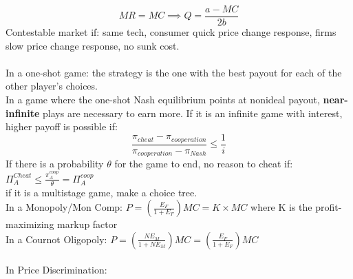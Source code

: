 \documentclass[nobib,fleqn,8pt]{article}
\begin{document}
\begin{equation*}
    MR = MC \implies Q = \frac{a-MC}{2b}
\end{equation*}
Contestable market if: same tech, consumer quick price change response, firms slow price change response, no sunk cost.\\~\\
In a one-shot game: the strategy is the one with the best payout for each of the other player's choices.\\
In a game where the one-shot Nash equilibrium points at nonideal payout, \textbf{near-infinite} plays are necessary to earn more. If it is an infinite game with interest, higher payoff is possible if:
\begin{equation*}
    \frac{\pi_{cheat}-\pi_{cooperation}}{\pi_{cooperation}-\pi_{Nash}}\leq \frac{1}{i}
\end{equation*}
If there is a probability $\theta$ for the game to end, no reason to cheat if: $\Pi_A^{Cheat}\leq \frac{\pi_A^{coop}}{\theta} = \Pi_A^{coop}$\\
if it is a multistage game, make a choice tree.\\
In a Monopoly/Mon Comp: $P = \left(\frac{E_F}{1+E_F}\right)MC = K\times MC$ where K is the profit-maximizing markup factor\\
In a Cournot Oligopoly: $P = \left(\frac{NE_M}{1+NE_M}\right)MC = \left(\frac{E_F}{1+E_F}\right)MC$\\~\\
In Price Discrimination:
\end{document}
